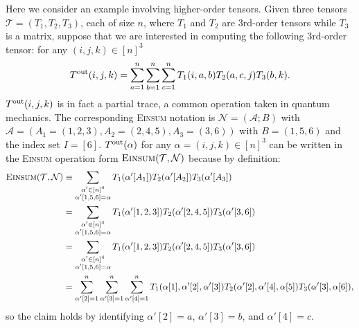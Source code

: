 \documentclass[twoside,11pt]{article}
\def\Einsum{\textsc{Einsum}}
\newcommand{\tensorcontraction}{\textsc{Einsum}}
\def\calN{\mathcal{N}}
\def\calA{\mathcal{A}}
\def\calT{\mathcal{T}}
\begin{document}
\begin{example}
\label{eg:tensor}
Here we consider an example involving higher-order tensors. Given three tensors $\calT = (T_1, T_2, T_3)$, each of size $n$, where $T_1$ and $T_2$ are 3rd-order tensors while $T_3$ is a matrix, suppose that we are interested in computing the following 3rd-order tensor: for any $(i, j, k) \in [n]^{3}$
\begin{align*}
T^{\rm out} (i, j, k) = \sum_{a = 1}^{n} \sum_{b = 1}^{n} \sum_{c = 1}^{n} T_{1} (i, a, b) T_{2} (a, c, j) T_{3} (b, k).
\end{align*}
$T^{\rm out} (i, j, k)$ is in fact a partial trace, a common operation taken in quantum mechanics. The corresponding \Einsum{} notation is $\calN = (\calA; B)$ with $\calA = (A_1 = (1, 2, 3), A_2 = (2, 4, 5), A_3 = (3, 6))$ with $B = (1, 5, 6)$ and the index set $I = [6]$. $T^{\rm out} (\alpha)$ for any $\alpha = (i, j, k) \in [n]^{3}$ can be written in the \Einsum{} operation form $\tensorcontraction(\calT, \calN)$ because by definition:
\begin{align*}
\tensorcontraction (\calT, \calN) & \equiv \sum_{\substack{\alpha' \in [n]^4 \\ \alpha' [1, 5, 6] = \alpha}} T_1 (\alpha' [A_1]) T_2 (\alpha' [A_2]) T_3 (\alpha' [A_3]) \\
& = \sum_{ \substack{\alpha' \in [n]^4 \\ \alpha' [1, 5, 6] = \alpha}} T_1 (\alpha' [1, 2, 3]) T_2 (\alpha' [2, 4, 5]) T_3 (\alpha' [3, 6]) \\
& = \sum_{\substack{\alpha' \in [n]^4 \\ \alpha' [1, 5, 6] = \alpha}} T_1 (\alpha' [1, 2, 3]) T_2 (\alpha' [2, 4, 5]) T_3 (\alpha' [3, 6]) \\
& = \sum_{\alpha' [2] = 1}^{n} \sum_{\alpha' [3] = 1}^{n} \sum_{\alpha' [4] = 1}^{n} T_{1} (\alpha [1], \alpha' [2], \alpha' [3]) T_{2} (\alpha' [2], \alpha' [4], \alpha [5]) T_{3} (\alpha' [3], \alpha [6]),
\end{align*}
so the claim holds by identifying $\alpha' [2] = a$, $\alpha' [3] = b$, and $\alpha' [4] = c$.
\end{example}
\end{document}
